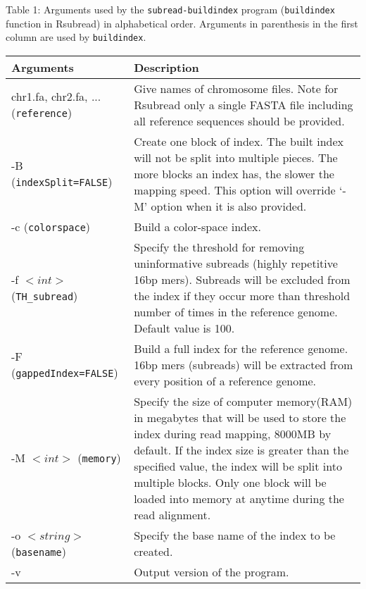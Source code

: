 \documentclass[12pt]{report}
\newcommand{\code}[1]{{\small\texttt{#1}}}
\newcommand{\Rsubread}{\textsf{Rsubread}}
\begin{document}
\begin{table}[!tpb]
\raggedright{Table 1: Arguments used by the \code{subread-buildindex} program (\code{buildindex} function in \Rsubread) in alphabetical order.
Arguments in parenthesis in the first column are used by \code{buildindex}.\newline\\}
\begin{tabular}{|p{4cm}|p{12cm}|}
\hline
Arguments & Description \\
\hline
chr1.fa, chr2.fa, ... \newline (\code{reference}) & Give names of chromosome files. Note for {\Rsubread} only a single FASTA file including all reference sequences should be provided.\\
\hline
-B \newline (\code{indexSplit=FALSE}) & Create one block of index. The built index will not be split into multiple pieces. The more blocks an index has, the slower the mapping speed. This option will override `-M' option when it is also provided.\\
\hline
-c \newline (\code{colorspace}) & Build a color-space index.\\
\hline
-f $<int>$ \newline (\code{TH\_subread}) & Specify the threshold for removing uninformative subreads (highly repetitive 16bp mers). Subreads will be excluded from the index if they occur more than threshold number of times in the reference genome. Default value is 100.\\
\hline
-F \newline (\code{gappedIndex=FALSE}) & Build a full index for the reference genome. 16bp mers (subreads) will be extracted from every position of a reference genome.\\
\hline
-M $<int>$ \newline (\code{memory}) & Specify the size of computer memory(RAM) in megabytes that will be used to store the index during read mapping, 8000MB by default. If the index size  is greater than the specified value, the index will be split into multiple blocks. Only one block will be loaded into memory at anytime during the read alignment.\\
\hline
-o $<string>$ \newline (\code{basename}) & Specify the base name of the index to be created.\\
\hline
-v & Output version of the program. \\
\hline
\end{tabular}
\end{table}
\end{document}
